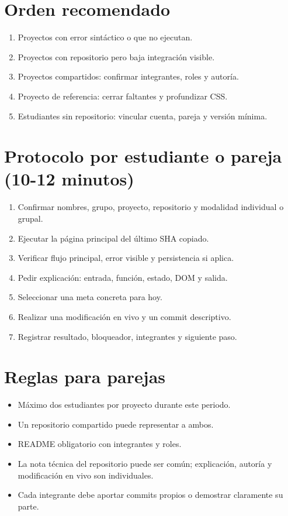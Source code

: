 \documentclass[10pt,a4paper]{article}
\begin{document}
\section*{Orden recomendado}
\begin{enumerate}
\item Proyectos con error sintáctico o que no ejecutan.
\item Proyectos con repositorio pero baja integración visible.
\item Proyectos compartidos: confirmar integrantes, roles y autoría.
\item Proyecto de referencia: cerrar faltantes y profundizar CSS.
\item Estudiantes sin repositorio: vincular cuenta, pareja y versión mínima.
\end{enumerate}

\newpage
\section*{Protocolo por estudiante o pareja (10-12 minutos)}
\begin{enumerate}
\item Confirmar nombres, grupo, proyecto, repositorio y modalidad individual o grupal.
\item Ejecutar la página principal del último SHA copiado.
\item Verificar flujo principal, error visible y persistencia si aplica.
\item Pedir explicación: entrada, función, estado, DOM y salida.
\item Seleccionar una meta concreta para hoy.
\item Realizar una modificación en vivo y un commit descriptivo.
\item Registrar resultado, bloqueador, integrantes y siguiente paso.
\end{enumerate}
\section*{Reglas para parejas}
\begin{itemize}
\item Máximo dos estudiantes por proyecto durante este periodo.
\item Un repositorio compartido puede representar a ambos.
\item README obligatorio con integrantes y roles.
\item La nota técnica del repositorio puede ser común; explicación, autoría y modificación en vivo son individuales.
\item Cada integrante debe aportar commits propios o demostrar claramente su parte.
\end{itemize}
\end{document}
